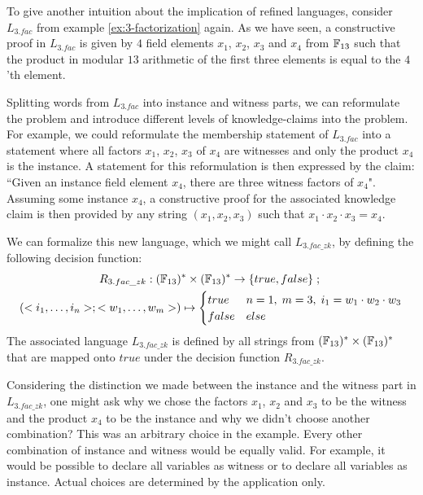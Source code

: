 \begin{example}[3-factorization]
\label{ex:L-3fac-zk}
 To give another intuition about the implication of refined languages, consider $L_{3.fac}$ from example \ref{ex:3-factorization} again. As we have seen, a constructive proof in $L_{3.fac}$ is given by $4$ field elements $x_1$, $x_2$, $x_3$ and $x_4$ from $\mathbb{F}_{13}$ such that the product in modular $13$ arithmetic of the first three elements is equal to the $4$'th element. 

Splitting words from $L_{3.fac}$ into instance and witness parts, we can reformulate the problem and introduce different levels of knowledge-claims into the problem. For example, we could reformulate the membership statement of $L_{3.fac}$ into a statement where all factors $x_1$, $x_2$, $x_3$ of $x_4$ are witnesses and only the product $x_4$ is the instance. A statement for this reformulation is then expressed by the claim: ``Given an instance field element $x_4$, there are three witness factors of $x_4$". Assuming some instance $x_4$, a constructive proof for the associated knowledge claim is then provided by any string $(x_1,x_2,x_3)$ such that $x_1\cdot x_2\cdot x_3= x_4$. 

We can formalize this new language, which we might call $L_{3.fac\_zk}$, by defining the following decision function:
\begin{multline*}
\label{R3-fac-zk}
R_{3.fac\_zk} : (\mathbb{F}_{13})^* \times (\mathbb{F}_{13})^* \to \{true, false\}\;;\;\\
(<i_1,\ldots,i_n>;<w_1,\ldots, w_m>) \mapsto
\begin{cases}
true & n=1,\; m=3,\; i_1 = w_1\cdot w_2 \cdot w_3\\
false & else
\end{cases}
\end{multline*}
The associated language $L_{3.fac\_zk}$ is defined by all strings from $(\mathbb{F}_{13})^* \times (\mathbb{F}_{13})^*$ that are mapped onto $true$ under the decision function $R_{3.fac\_zk}$. 

Considering the distinction we made between the instance and the witness part in $L_{3.fac\_zk}$, one might ask why we chose the factors $x_1$, $x_2$ and $x_3$ to be the witness and the product $x_4$ to be the instance and why we didn't choose another combination? This was an arbitrary choice in the example. Every other combination of instance and witness would be equally valid. For example, it would be possible to declare all variables as witness or to declare all variables as instance. Actual choices are determined by the application only.
\end{example}
